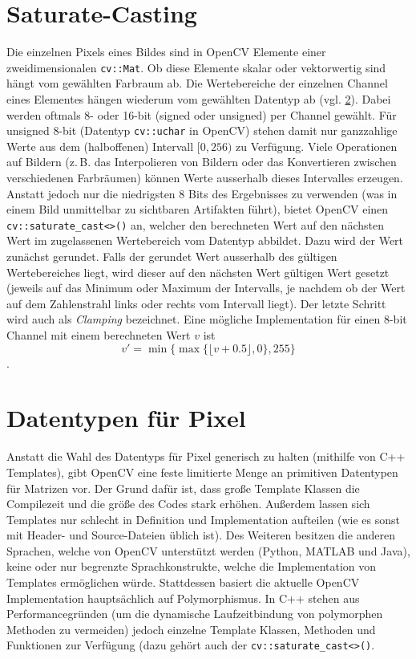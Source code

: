 \documentclass{whswinvcbook}
\begin{document}
\section{Saturate-Casting}
Die einzelnen Pixels eines Bildes sind in OpenCV Elemente einer zweidimensionalen \texttt{cv::Mat}. Ob diese Elemente skalar oder vektorwertig sind hängt vom gewählten Farbraum ab. Die Wertebereiche der einzelnen Channel eines Elementes hängen wiederum vom gewählten Datentyp ab (vgl. \ref{section-pixeltypes}). Dabei werden oftmals 8- oder 16-bit (signed oder unsigned) per Channel gewählt. Für unsigned 8-bit (Datentyp \texttt{cv::uchar} in OpenCV) stehen damit nur ganzzahlige Werte aus dem (halboffenen) Intervall $[0, 256)$ zu Verfügung. Viele Operationen auf Bildern (z.\,B. das Interpolieren von Bildern oder das Konvertieren zwischen verschiedenen Farbräumen) können Werte ausserhalb dieses Intervalles erzeugen. Anstatt jedoch nur die niedrigsten 8 Bits des Ergebnisses zu verwenden (was in einem Bild unmittelbar zu sichtbaren Artifakten führt), bietet OpenCV einen \texttt{cv::saturate\_cast<>()} an, welcher den berechneten Wert auf den nächsten Wert im zugelassenen Wertebereich vom Datentyp abbildet. Dazu wird der Wert zunächst gerundet. Falls der gerundet Wert ausserhalb des gültigen Wertebereiches liegt, wird dieser auf den nächsten Wert gültigen Wert gesetzt (jeweils auf das Minimum oder Maximum der Intervalls, je nachdem ob der Wert auf dem Zahlenstrahl links oder rechts vom Intervall liegt). Der letzte Schritt wird auch als \textit{Clamping} bezeichnet. Eine mögliche Implementation\cite{opencv3} für einen 8-bit Channel mit einem berechneten Wert $v$ ist $$v'=\min\{\max\{\lfloor v+0.5\rfloor,0\},255\}$$.
\section{Datentypen für Pixel}\label{section-pixeltypes}
Anstatt die Wahl des Datentyps für Pixel generisch zu halten (mithilfe von C++ Templates), gibt OpenCV eine feste limitierte Menge an primitiven Datentypen für Matrizen vor.\cite{opencv3} Der Grund dafür ist, dass große Template Klassen die Compilezeit und die größe des Codes stark erhöhen. Außerdem lassen sich Templates nur schlecht in Definition und Implementation aufteilen (wie es sonst mit Header- und Source-Dateien üblich ist). Des Weiteren besitzen die anderen Sprachen, welche von OpenCV unterstützt werden (Python, MATLAB und Java), keine oder nur begrenzte Sprachkonstrukte, welche die Implementation von Templates ermöglichen würde. Stattdessen basiert die aktuelle OpenCV Implementation hauptsächlich auf Polymorphismus. In C++ stehen aus Performancegründen (um die dynamische Laufzeitbindung von polymorphen Methoden zu vermeiden) jedoch einzelne Template Klassen, Methoden und Funktionen zur Verfügung (dazu gehört auch der \texttt{cv::saturate\_cast<>()}.
\end{document}
